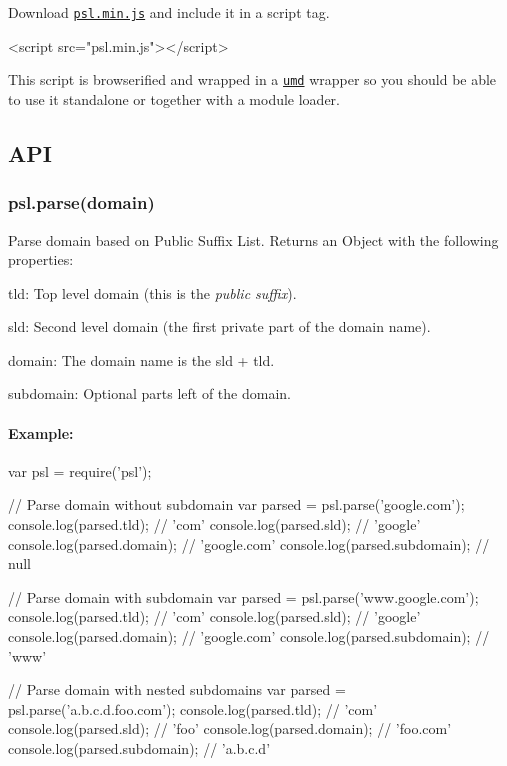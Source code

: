 Download \href{https://raw.githubusercontent.com/wrangr/psl/master/dist/psl.min.js}{\tt psl.\+min.\+js} and include it in a script tag.


\begin{DoxyCode}
<script src="psl.min.js"></script>
\end{DoxyCode}


This script is browserified and wrapped in a \href{https://github.com/umdjs/umd}{\tt umd} wrapper so you should be able to use it standalone or together with a module loader.

\subsection*{A\+PI}

\subsubsection*{{\ttfamily psl.\+parse(domain)}}

Parse domain based on Public Suffix List. Returns an {\ttfamily Object} with the following properties\+:


\begin{DoxyItemize}
\item {\ttfamily tld}\+: Top level domain (this is the {\itshape public suffix}).
\item {\ttfamily sld}\+: Second level domain (the first private part of the domain name).
\item {\ttfamily domain}\+: The domain name is the {\ttfamily sld} + {\ttfamily tld}.
\item {\ttfamily subdomain}\+: Optional parts left of the domain.
\end{DoxyItemize}

\paragraph*{Example\+:}


\begin{DoxyCode}
var psl = require('psl');

// Parse domain without subdomain
var parsed = psl.parse('google.com');
console.log(parsed.tld); // 'com'
console.log(parsed.sld); // 'google'
console.log(parsed.domain); // 'google.com'
console.log(parsed.subdomain); // null

// Parse domain with subdomain
var parsed = psl.parse('www.google.com');
console.log(parsed.tld); // 'com'
console.log(parsed.sld); // 'google'
console.log(parsed.domain); // 'google.com'
console.log(parsed.subdomain); // 'www'

// Parse domain with nested subdomains
var parsed = psl.parse('a.b.c.d.foo.com');
console.log(parsed.tld); // 'com'
console.log(parsed.sld); // 'foo'
console.log(parsed.domain); // 'foo.com'
console.log(parsed.subdomain); // 'a.b.c.d'
\end{DoxyCode}


